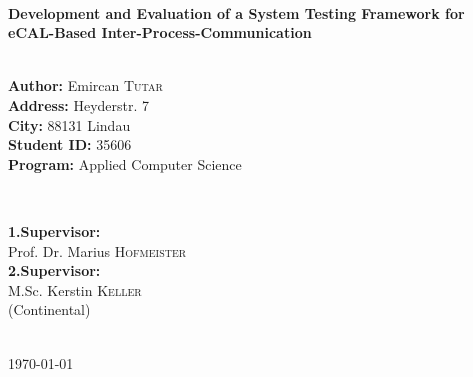 \documentclass[a4paper,11pt,singlespacing]{article}
\begin{document}
\begin{titlepage}
	
	\HRule \\[0.4cm]
	{ \huge \bfseries Development and Evaluation of a System Testing Framework for eCAL-Based Inter-Process-Communication}\\[0.4cm] %
	\HRule \\[1.5cm]
	
	
	\begin{minipage}{0.5\textwidth}
		\begin{flushleft} \large
			\textbf{Author:} Emircan \textsc{Tutar}\\ %
				\textbf{Address:} Heyderstr. 7\\
				\textbf{City:} 88131 Lindau\\
				\textbf{Student ID:} 35606\\
				\textbf{Program:} Applied Computer Science
		
		\end{flushleft}
	\end{minipage}
	~
	\begin{minipage}{0.45\textwidth}
		\begin{flushleft} \large
			\textbf{1.Supervisor:} \\
			Prof. Dr. Marius \textsc{Hofmeister} \\ %
			\textbf{2.Supervisor:} \\
			M.Sc. Kerstin \textsc{Keller} \\ %
			(Continental) \\
		\end{flushleft}
	\end{minipage}\\[1cm]
	
	
	
	{\large \today}\\[2cm] %
	
	\vfill %
	
\end{titlepage}

\tableofcontents
\pagebreak






\printbibliography[heading=bibintoc]
\end{document}
